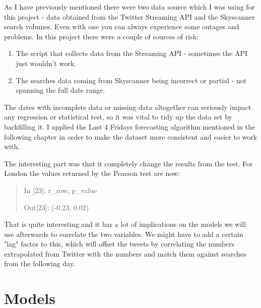 \documentclass[minf,frontabs,twoside,singlespacing,parskip]{infthesis}
\begin{document}
As I have previously mentioned there were two data source which I was using for this project - data obtained from the Twitter Streaming API and the Skyscanner search volumes. Even with one you can always experience some outages and problems. In this project there were a couple of sources of risk:
\begin{enumerate}
\item The script that collects data from the Streaming API - sometimes the API just wouldn't work. 
\item The searches data coming from Skyscanner being incorrect or partial - not spanning the full date range.
\end{enumerate}

The dates with incomplete data or missing data altogether can seriously impact any regression or statistical test, so it was vital to tidy up the data set by backfilling it. I applied the Last 4 Fridays forecasting algorithm mentioned in the following chapter in order to make the dataset more consistent and easier to work with. 

The interesting part was that it completely change the results from the test. For London the values returned by the Pearson test are now:

\begin{quotation}
In [23]: r\_row, p\_value

Out[23]: (-0.23, 0.02)
\end{quotation}

That is quite interesting and it has a lot of implications on the models we will use afterwards to correlate the two variables. 
We might have to add a certain "lag" factor to this, which will offset the tweets by correlating the numbers extrapolated from Twitter with the numbers and match them against searches from the following day.




\chapter{Models}
\label{chap:model}
\end{document}
